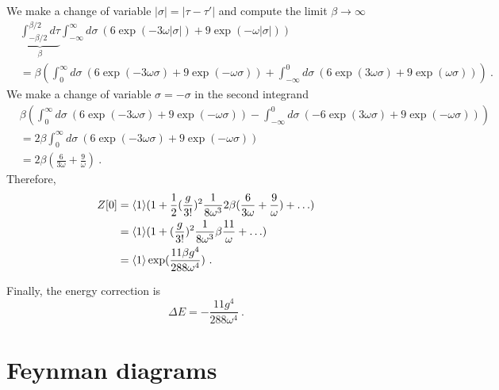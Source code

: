     We make a change of variable $|\sigma| = |\tau - \tau'|$ and compute the limit $\beta \rightarrow \infty$
    \begin{equation*}
    \begin{aligned}
        & \underbrace{\int_{- \beta / 2}^{\beta/2} d\tau}_\beta \int_{-\infty}^{\infty} d\sigma ~ (6 \exp(- 3 \omega |\sigma|) + 9 \exp(- \omega |\sigma|)) \\ & = \beta (\int_{0}^{\infty} d\sigma ~ (6 \exp(- 3 \omega \sigma) + 9 \exp(- \omega \sigma))  + \int_{-\infty}^{0} d\sigma ~ (6 \exp(3 \omega \sigma) + 9 \exp(\omega \sigma)))  ~.
    \end{aligned}
    \end{equation*}
    We make a change of variable $\sigma = - \sigma$ in the second integrand 
    \begin{equation*}
    \begin{aligned}
        & \beta (\int_{0}^{\infty} d\sigma ~ (6 \exp(- 3 \omega \sigma) + 9 \exp(- \omega \sigma)) - \int_{-\infty}^{0} d\sigma ~ ( -6 \exp(3 \omega \sigma) + 9 \exp(- \omega \sigma))) \\ & = 2 \beta \int_{0}^{\infty} d\sigma ~ (6 \exp(- 3 \omega \sigma) + 9 \exp(- \omega \sigma)) \\ & = 2 \beta (\frac{6}{3 \omega} + \frac{9}{\omega}) ~.
    \end{aligned}
    \end{equation*}
    Therefore,
    \begin{equation*}
    \begin{aligned}
        Z[0] & = \langle1\rangle ( 1 + \frac{1}{2} (\frac{g}{3!})^2 \frac{1}{8 \omega^3}2 \beta (\frac{6}{3 \omega} + \frac{9}{\omega}) + \ldots) \\ & = \langle1\rangle ( 1 +  (\frac{g}{3!})^2 \frac{1}{8 \omega^3} \beta \frac{11}{\omega}  + \ldots) \\ & = \langle1\rangle \exp(\frac{11 \beta g^4}{288 \omega^4} )~.
    \end{aligned}
    \end{equation*}

    Finally, the energy correction is 
    \begin{equation*}
        \Delta E = - \frac{11 g^4}{288 \omega^4} ~.
    \end{equation*}

    \section{Feynman diagrams}